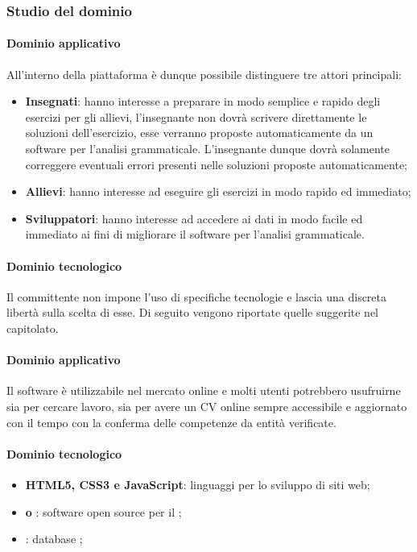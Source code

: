 	\subsubsection{Studio del dominio}
	\paragraph{Dominio applicativo} \Spazio
	All'interno della piattaforma è dunque possibile distinguere tre attori principali:
	\begin{itemize} 
	\item \textbf{Insegnati}: hanno interesse a preparare in modo semplice e rapido degli esercizi per gli allievi, l'insegnante non dovrà scrivere direttamente le soluzioni dell'esercizio, esse verranno proposte automaticamente da un software per
	l'analisi grammaticale. L'insegnante dunque dovrà solamente correggere eventuali errori presenti nelle soluzioni proposte automaticamente;
	\item \textbf{Allievi}: hanno interesse ad eseguire gli esercizi in modo rapido ed immediato;
	\item \textbf{Sviluppatori}: hanno interesse ad accedere ai dati in modo facile ed immediato ai fini di migliorare il software per l'analisi grammaticale.
	\end{itemize}
	\paragraph{Dominio tecnologico} \Spazio
	Il committente non impone l'uso di specifiche tecnologie e lascia una discreta libertà sulla scelta di esse. Di seguito vengono riportate quelle suggerite nel capitolato.
	\paragraph{Dominio applicativo} 
	Il software è utilizzabile nel mercato online e molti utenti potrebbero usufruirne sia per cercare lavoro, sia per avere un CV online sempre accessibile e aggiornato con il tempo con la conferma delle competenze da entità verificate.
	\paragraph{Dominio tecnologico} 
	\begin{itemize}
		\item \textbf{HTML5, CSS3 e JavaScript}: linguaggi per lo sviluppo di siti web;
		\item \textbf{ o }: software open source per il ;
		\item  \textbf{}: database ;
	\end{itemize}
	
